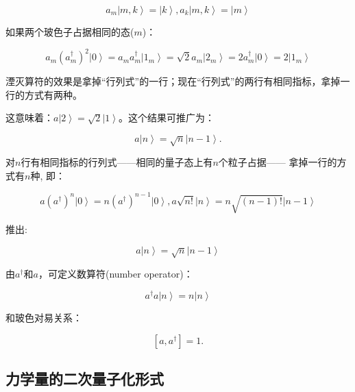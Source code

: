 \begin{equation*}
a_m \left| {m,k} \right\rangle = \left| k \right\rangle , a_k \left|
{m,k} \right\rangle = \left| m \right\rangle
\end{equation*}


如果两个玻色子占据相同的态($m$)：

\begin{equation*}
a_m (a_m^{\dag})^2 \left| 0 \right\rangle = a_m a_m^{\dag} \left|
{1_m} \right\rangle = \sqrt 2 a_m  \left| {2_m} \right\rangle = 2
a_m^{\dag} \left| 0 \right\rangle = 2 \left| {1_m} \right\rangle
\end{equation*}


湮灭算符的效果是拿掉“行列式”的一行；现在“行列式”的两行有相同指标，拿掉一行的方式有两种。

这意味着：$a \left| 2 \right\rangle = \sqrt 2 \left| 1 \right\rangle
$。这个结果可推广为：

\begin{equation*}
a \left| n \right\rangle = \sqrt n \left| {n-1} \right\rangle .
\end{equation*}

对$n$行有相同指标的行列式——相同的量子态上有$n$个粒子占据——
拿掉一行的方式有$n$种, 即：

\begin{equation*}
a (a^{\dag})^n \left| 0 \right\rangle = n (a^{\dag})^{n-1} \left| 0
\right\rangle , a \sqrt {n!} \left| n \right\rangle  = n \sqrt
{(n-1)!} \left| {n-1} \right\rangle
\end{equation*}

推出:

\begin{equation}\label{boson recursion minus}
a \left| n \right\rangle = \sqrt n \left| {n-1} \right\rangle
\end{equation}


由$a^\dagger$和$a$，可定义数算符(number operator)：

\begin{equation}\label{Boson number operator}
a^{\dag} a \left| n \right\rangle = n \left| n \right\rangle
\end{equation}

和玻色对易关系：

\begin{equation}\label{Boson commutation}
[a, a^{\dagger}] =1 .
\end{equation}


\subsection{力学量的二次量子化形式}

